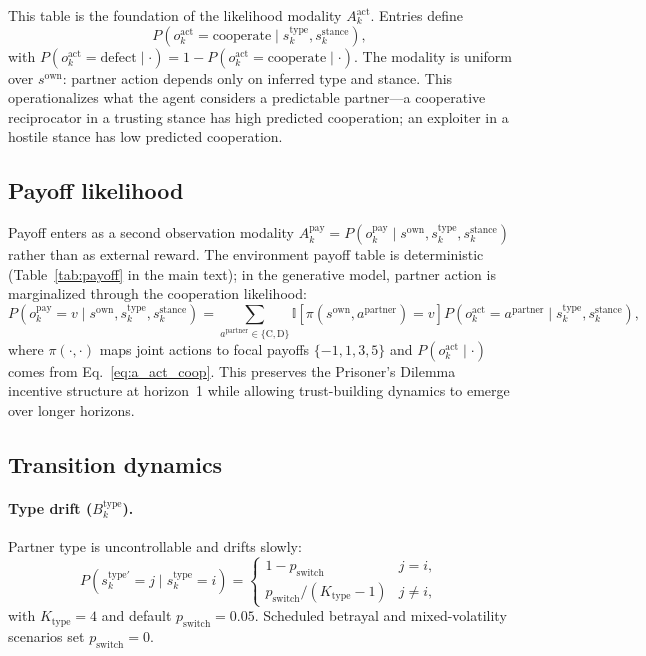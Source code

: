 This table is the foundation of the likelihood modality $A^{\text{act}}_k$. Entries define
\begin{equation}
P\!\left(o_k^{\mathrm{act}}=\mathrm{cooperate}\mid s_k^{\mathrm{type}}, s_k^{\mathrm{stance}}\right),
\label{eq:a_act_coop}
\end{equation}
with $P(o_k^{\mathrm{act}}=\mathrm{defect}\mid\cdot)=1-P(o_k^{\mathrm{act}}=\mathrm{cooperate}\mid\cdot)$. The modality is uniform over $s^{\mathrm{own}}$: partner action depends only on inferred type and stance. This operationalizes what the agent considers a predictable partner---a cooperative reciprocator in a trusting stance has high predicted cooperation; an exploiter in a hostile stance has low predicted cooperation.

\subsection{Payoff likelihood}

Payoff enters as a second observation modality $A^{\mathrm{pay}}_k=P(o_k^{\mathrm{pay}}\mid s^{\mathrm{own}},s_k^{\mathrm{type}},s_k^{\mathrm{stance}})$ rather than as external reward. The environment payoff table is deterministic (Table~\ref{tab:payoff} in the main text); in the generative model, partner action is marginalized through the cooperation likelihood:
\begin{equation}
P\!\left(o_k^{\mathrm{pay}}=v \mid s^{\mathrm{own}}, s_k^{\mathrm{type}}, s_k^{\mathrm{stance}}\right)
= \sum_{a^{\mathrm{partner}}\in\{\mathrm{C},\mathrm{D}\}}
\mathbb{I}\!\left[\pi(s^{\mathrm{own}}, a^{\mathrm{partner}})=v\right]
P\!\left(o_k^{\mathrm{act}}=a^{\mathrm{partner}}\mid s_k^{\mathrm{type}}, s_k^{\mathrm{stance}}\right),
\label{eq:a_pay_marginal}
\end{equation}
where $\pi(\cdot,\cdot)$ maps joint actions to focal payoffs $\{-1,1,3,5\}$ and $P(o_k^{\mathrm{act}}\mid\cdot)$ comes from Eq.~\eqref{eq:a_act_coop}. This preserves the Prisoner's Dilemma incentive structure at horizon~1 while allowing trust-building dynamics to emerge over longer horizons.

\subsection{Transition dynamics}

\paragraph{Type drift ($B_k^{\mathrm{type}}$).}
Partner type is uncontrollable and drifts slowly:
\begin{equation}
P(s_k^{\mathrm{type}\prime}=j\mid s_k^{\mathrm{type}}=i)=
\begin{cases}
1-p_{\mathrm{switch}} & j=i,\\
p_{\mathrm{switch}}/(K_{\mathrm{type}}-1) & j\neq i,
\end{cases}
\label{eq:b_type}
\end{equation}
with $K_{\mathrm{type}}=4$ and default $p_{\mathrm{switch}}=0.05$. Scheduled betrayal and mixed-volatility scenarios set $p_{\mathrm{switch}}=0$.


